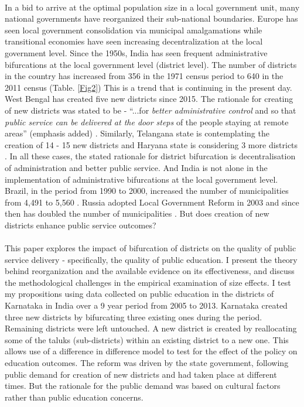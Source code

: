 \documentclass[12pt, a4paper]{article}
\begin{document}
\paragraph{} In a bid to arrive at the optimal population size in a local government unit, many national governments have reorganized their sub-national boundaries. Europe has seen local government consolidation via municipal amalgamations while transitional economies have seen increasing decentralization at the local government level. Since the 1950s, India has seen frequent administrative bifurcations at the local government level (district level). The number of districts in the country has increased from 356 in the 1971 census period to 640 in the 2011 census (Table. \ref{Fig2}) This is a trend that is continuing in the present day. West Bengal has created five new districts since 2015. The rationale for creating of new districts was stated to be - ``...for \textit{better administrative control} and so that \textit{public service can be delivered at the door steps} of the people staying at remote areas'' (emphasis added) \parencite{Mamata}. Similarly, Telangana state is contemplating the creation of 14 - 15 new districts \parencite{Telengana} and Haryana state is considering 3 more districts \parencite{Haryana}. In all these cases, the stated rationale for district bifurcation is decentralisation of administration and better public service. And India is not alone in the implementation of administrative bifurcations at the local government level. Brazil, in the period from 1990 to 2000, increased the number of municipalities from 4,491 to 5,560 \parencite{tomio2005creation}. Russia adopted Local Government Reform in 2003 and since then has doubled the number of municipalities \parencite{turgel2008new}\nocite{avellaneda_is_2015}. But does creation of new districts enhance public service outcomes?

\paragraph{}This paper explores the impact of bifurcation of districts on the quality of public service delivery - specifically, the quality of public education. I present the theory behind reorganization and the available evidence on its effectiveness, and discuss the methodological challenges in the empirical examination of size effects. I test my propositions using data collected on public education in the districts of Karnataka in India over a 9 year period from 2005 to 2013. Karnataka created three new districts by bifurcating three existing ones during the period. Remaining districts were left untouched. A new district is created by reallocating some of the taluks (sub-districts) within an existing district to a new one. This allows use of a difference in difference model to test for the effect of the policy on education outcomes. The reform was driven by the state government, following public demand for creation of new districts and had taken place at different times. But the rationale for the public demand was based on cultural factors rather than public education concerns. 
\end{document}
